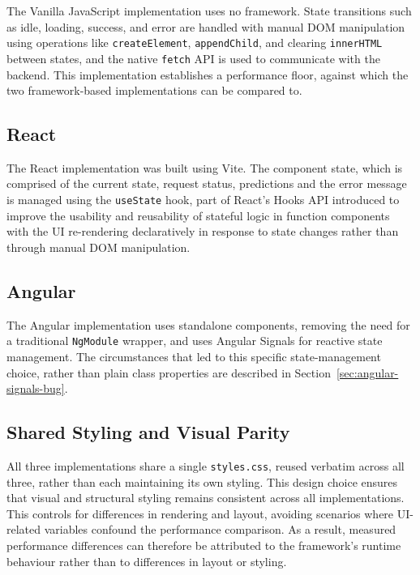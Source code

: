 \documentclass[11pt,a4paper]{report}
\begin{document}
The Vanilla JavaScript implementation uses no framework. State transitions such as idle, loading, success, and error are handled with manual DOM manipulation using operations like \texttt{createElement}, \texttt{appendChild}, and clearing \texttt{innerHTML} between states, and the native \texttt{fetch} API is used to communicate with the backend. This implementation establishes a performance floor, against which the two framework-based implementations can be compared to. 

\subsection{React}

The React implementation was built using Vite. The component state, which is comprised of the current state, request status, predictions and the error message is managed using the \texttt{useState} hook, part of React's Hooks API introduced to improve the usability and reusability of stateful logic in function components~\cite{luojus2021} with the UI re-rendering declaratively in response to state changes rather than through manual DOM manipulation. 

\subsection{Angular}

The Angular implementation uses standalone components, removing the need for a traditional \texttt{NgModule} wrapper, and uses Angular Signals for reactive state management. The circumstances that led to this specific state-management choice, rather than plain class properties are described in Section~\ref{sec:angular-signals-bug}.

\subsection{Shared Styling and Visual Parity}

All three implementations share a single \texttt{styles.css}, reused verbatim across all three, rather than each maintaining its own styling. This design choice ensures that visual and structural styling remains consistent across all implementations. This controls for differences in rendering and layout, avoiding scenarios where UI-related variables confound the performance comparison. As a result, measured performance differences can therefore be attributed to the framework's runtime behaviour rather than
to differences in layout or styling. 
\end{document}
